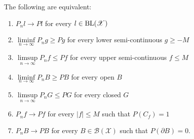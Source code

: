\begin{theorem}[Portmanteau] \label{3-7-1}
	The following are equivalent:
	\begin{enumerate}[label=(\roman*)]
		\item $P_n l \to Pl$ for every $l \in \operatorname{BL}(\mathscr{X})$
		\item $\liminf\limits_{n \to \infty} P_n g \ge Pg$ for every lower semi-continuous $g \ge -M$
		\item $\limsup\limits_{n \to \infty} P_n f \le Pf$ for every upper semi-continuous $f \le M$
		\item $\liminf\limits_{n \to \infty} P_n B \ge PB$ for every open $B$
		\item $\limsup\limits_{n \to \infty} P_n G \le PG$ for every closed $G$
		\item $P_n f \to Pf$ for every $\left| f \right| \le M$ such that $P(C_f) = 1$
		\item $P_n B \to PB$ for every $B \in \mathscr{B}(\mathscr{X})$ such that $P\left( \partial B \right) = 0$.
	\end{enumerate}
\end{theorem}
